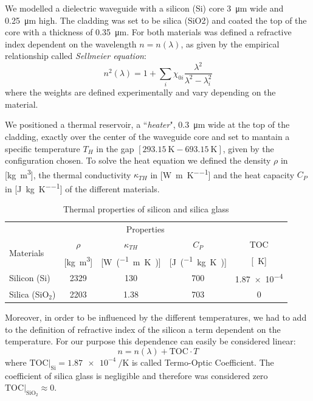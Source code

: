 \documentclass[12pt,a4paper,twoside]{article}
\begin{document}
We modelled a dielectric waveguide with a silicon (Si) core \SI{3}{\um} wide and \SI{.25}{\um} high.
The cladding was set to be silica (SiO2) and coated the top of the core with a thickness of \SI{.35}{\um}.
For both materials was defined a refractive index dependent on the wavelength $n=n(\lambda)$, as given by the empirical relationship called \textit{Sellmeier equation}:
\begin{equation}
	n^2(\lambda) = 1+ \sum_i \chi_{0i}\frac{\lambda^2}{\lambda^2-\lambda^2_i}
	\label{eq_sellmeier}
\end{equation}
where the weights are defined experimentally and vary depending on the material.

We positioned a thermal reservoir, a ``\textit{heater}", \SI{0.3}{\um} wide at the top of the cladding, exactly over the center of the waveguide core and set to mantain a specific temperature $T_H$ in the gap $[\SI{293.15}{\K} - \SI{693.15}{\K}]$, given by the configuration chosen.
To solve the heat equation we defined the density $\rho$ in [\si{\kg\m^3}], the thermal conductivity $\kappa_{TH}$ in [\si{\W\per\m\per\K}] and the heat capacity $C_P$ in [\si{\J\per\kg\per\K}] of the different materials.

\begin{table}[ht]
\centering
  \begin{tabular}{lcccc}  
    \toprule
		& \multicolumn{3}{c}{Properties} \\
    \cmidrule(r){2-5}
    	\multirow{2}{*}{Materials}    & $\rho$ & $\kappa_{TH}$ & $C_P$ & TOC\\
  		& [\si{\kg\m^3}] & [\si{\W\per(\m\K)}] & [\si{\J\per(\kg\K)}] & [\si{\per\K}] \\
    \midrule
    Silicon (Si)			& 2329	& 130	& 700	& \num{1.87e-4}\\
    Silica (SiO$_2$)		& 2203	& 1.38	& 703	& 0\\
    \bottomrule
  \end{tabular}
  \label{tab_materials}
  \caption{Thermal properties of silicon and silica glass}
\end{table}

Moreover, in order to be influenced by the different temperatures, we had to add to the definition of refractive index of the silicon a term dependent on the temperature.
For our purpose this dependence can easily be considered linear:
\begin{equation}
n = n(\lambda)+\mathrm{TOC}\cdot T
\end{equation}
where $\mathrm{TOC}|_{\mathrm{Si}} = \SI{1.87e-4}{\per\K}$\cite{n_db} is called Termo-Optic Coefficient. The coefficient of silica glass is negligible and therefore was considered zero $\mathrm{TOC}|_{\mathrm{SiO}_2} \approx 0$.
\end{document}
